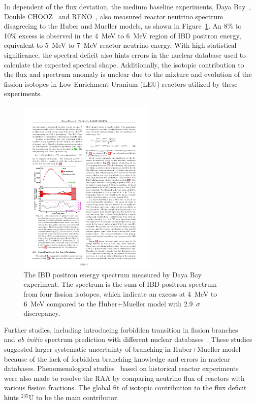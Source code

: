     In dependent of the flux deviation, the medium baseline experiments, Daya Bay~\cite{bib:DYBSpectrum}, Double CHOOZ~\cite{bib:DBChooz} and RENO~\cite{bib:RENO}, also measured reactor neutrino spectrum disagreeing to the Huber and Mueller models, as shown in Figure~\ref{fig:DYBSpectrum}.
    An 8\% to 10\% excess is observed in the 4~MeV to 6~MeV region of IBD positron energy, equivalent to 5~MeV to 7~MeV reactor neutrino energy.
    With high statistical significance, the spectral deficit also hints errors in the nuclear database used to calculate the expected spectral shape.
    Additionally, the isotopic contribution to the flux and spectrum anomaly is unclear due to the mixture and evolution of the fission isotopes in Low Enrichment Uranium (LEU) reactors utilized by these experiments.
 \begin{figure}[h!]
    \centering
    \includegraphics[width=0.6\textwidth]{Figures/DYBSpectrum.pdf}
    \caption[Daya Bay IBD positron energy spectrum]{The IBD positron energy spectrum measured by Daya Bay experiment.
    The spectrum is the sum of IBD positron spectrum from four fission isotopes, which indicate an excess at 4~MeV to 6~MeV compared to the Huber+Mueller model with 2.9~$\sigma$ discrepancy.}
    \label{fig:DYBSpectrum}
    
\end{figure} 
    

    Further studies, including introducing forbidden transition in fission branches~\cite{bib:hayes} and \textit{ab initio} spectrum prediction with different nuclear databases~\cite{bib:dywer}.
    These studies suggested larger systematic uncertainty of branching in Huber+Mueller model because of the lack of forbidden branching knowledge and errors in nuclear databases.
    Phenomenological studies~\cite{bib:giunti2019} based on historical reactor experiments were also made to resolve the RAA by comparing neutrino flux of reactors with various fission fractions.
    The global fit of isotopic contribution to the flux deficit hints $^{235}$U to be the main contributor. 
    
